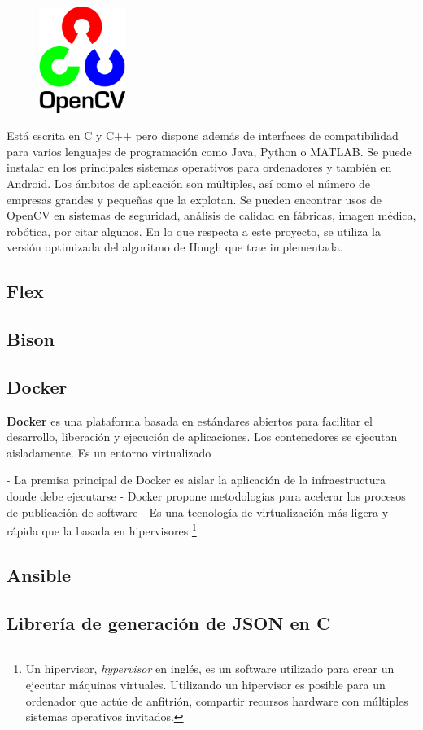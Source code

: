 \begin{figure}
    \centering
    \includegraphics[width=0.25\textwidth]{imaxes/e-fundamentos-tecnologicos/logo-opencv.png}
\end{figure}

Está escrita en C y C++ pero dispone además de interfaces de compatibilidad para varios lenguajes de programación como Java, Python o MATLAB. Se puede instalar en los principales sistemas operativos para ordenadores y también en Android. Los ámbitos de aplicación son múltiples, así como el número de empresas grandes y pequeñas que la explotan. Se pueden encontrar usos de OpenCV en sistemas de seguridad, análisis de calidad en fábricas, imagen médica, robótica, por citar algunos. En lo que respecta a este proyecto, se utiliza la versión optimizada del algoritmo de Hough que trae implementada.

\subsection{Flex}

\subsection{Bison}

\subsection{Docker}

\textbf{Docker} \cite{dockerincEmpoweringAppDevelopment} es una plataforma basada en estándares abiertos para facilitar el desarrollo, liberación y ejecución de aplicaciones.
Los contenedores se ejecutan aisladamente. Es un entorno virtualizado

- La premisa principal de Docker es aislar la aplicación de la infraestructura donde debe ejecutarse
- Docker propone metodologías para acelerar los procesos de publicación de software
- Es una tecnología de virtualización más ligera y rápida que la basada en hipervisores \footnote{Un hipervisor, \emph{hypervisor} en inglés, es un software utilizado para crear un ejecutar máquinas virtuales. Utilizando un hipervisor es posible para un ordenador que actúe de anfitrión, compartir recursos hardware con múltiples sistemas operativos invitados.}




\subsection{Ansible}

\subsection{Librería de generación de JSON en C}